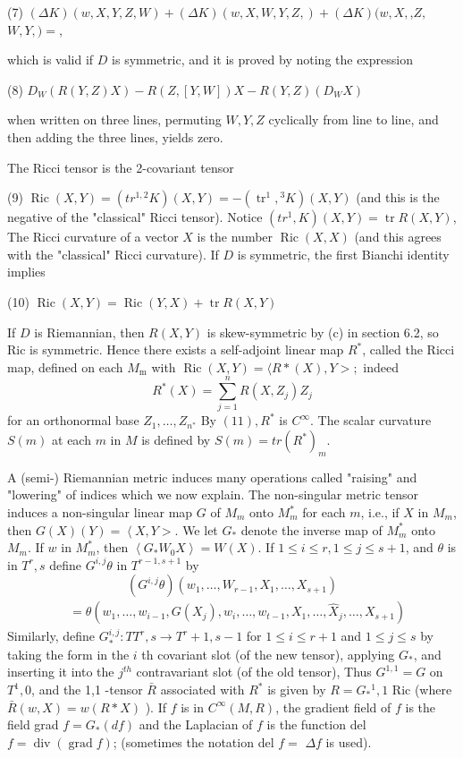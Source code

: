 \documentclass[10pt]{article}
\begin{document}
(7) $(\Delta K)(w, X, Y, Z, W)+(\Delta K)(w, X, W, Y, Z,)+(\Delta K)(w, X,$,$Z ,$ $W, Y,)=$,

which is valid if $D$ is symmetric, and it is proved by noting the expression

(8) $D_{W}(R(Y, Z) X)-R(Z,[Y, W]) X-R(Y, Z)\left(D_{W} X\right)$

when written on three lines, permuting $W, Y, Z$ cyclically from line to line, and then adding the three lines, yields zero.

The Ricci tensor is the 2-covariant tensor

(9) $\operatorname{Ric}(X, Y)=\left(t r^{1,2} K\right)(X, Y)=-\left(\operatorname{tr}^{1},{ }^{3} K\right)(X, Y)$ (and this is the negative of the "classical" Ricci tensor). Notice $\left(t r^{1}, K\right)(X, Y)=\operatorname{tr} R(X, Y)$, The Ricci curvature of a vector $X$ is the number $\operatorname{Ric}(X, X)$ (and this agrees with the "classical" Ricci curvature). If $D$ is symmetric, the first Bianchi identity implies

(10) $\operatorname{Ric}(X, Y)=\operatorname{Ric}(Y, X)+\operatorname{tr} R(X, Y)$

If $D$ is Riemannian, then $R(X, Y)$ is skew-symmetric by (c) in section 6.2, so Ric is symmetric. Hence there exists a self-adjoint linear map $R^{*}$, called the Ricci map, defined on each $M_{\mathrm{m}}$ with $\operatorname{Ric}(X, Y)=\langle R *(X), Y>;$ indeed
$$
R^{*}(X)=\sum_{j=1}^{n} R\left(X, Z_{j}\right) Z_{j}
$$
for an orthonormal base $Z_{1}, \ldots, Z_{n^{*}}$ By $(11), R^{*}$ is $C^{\infty}$. The scalar curvature $S(m)$ at each $m$ in $M$ is defined by $S(m)=t r\left(R^{*}\right)_{m}$.

A (semi-) Riemannian metric induces many operations called "raising" and "lowering" of indices which we now explain. The non-singular metric tensor induces a non-singular linear map $G$ of $M_{m}$ onto $M_{m}^{*}$ for each $m$, i.e., if $X$ in $M_{m}$, then $G(X)(Y)=\left\langle X, Y>\right.$. We let $G_{*}$ denote the inverse map of $M_{m}^{*}$ onto $M_{m}$. If $w$ in $M_{m}^{*}$, then $\left\langle G_{*} W_{0} X\right\rangle=W(X)$. If $1 \leq i \leq r, 1 \leq j \leq s+1$, and $\theta$ is in $T^{r}, s$ define $G^{i, j} \theta$ in $T^{r-1, s+1}$ by
$$
\left(G^{i, j} \theta\right)\left(w_{1}, \ldots, W_{r-1}, X_{1}, \ldots, X_{s+1}\right)
$$
$$
\begin{aligned}
& =\theta\left(w_{1}, \ldots, w_{i-1}, G\left(X_{j}\right), w_{i}, \ldots, w_{t-1}, X_{1}, \ldots, \widehat{X}_{j}, \ldots, X_{s+1}\right)
\end{aligned}
$$
Similarly, define $G_{*}^{i, j}: T T^{r}, s \rightarrow T^{r}+1, s-1$ for $1 \leq i \leq r+1$ and $1 \leq j \leq s$ by taking the form in the $i$ th covariant slot (of the new tensor), applying $G_{*}$, and inserting it into the $j^{t h}$ contravariant slot (of the old tensor), Thus $G^{1,1}=G$ on $T^{1}, 0$, and the 1,1 -tensor $\bar{R}$ associated with $R^{*}$ is given by $R=G_{*}{ }^{1}, 1$ Ric (where $\bar{R}(w, X)=w(R * X)$ ). If $f$ is in $C^{\infty}(M, R)$, the gradient field of $f$ is the field grad $f=G_{*}(d f)$ and the Laplacian of $f$ is the function del $f=\operatorname{div}(\operatorname{grad} f)$; (sometimes the notation del $f=$ $\Delta f$ is used).
\end{document}
